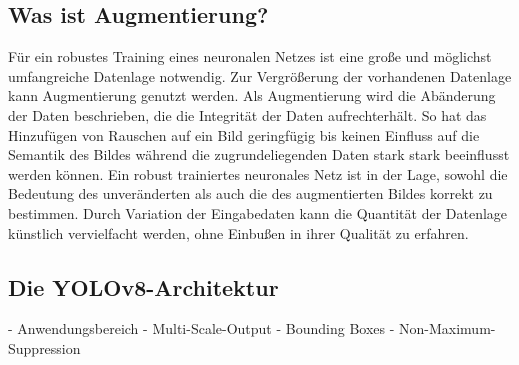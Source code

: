 

\subsection{Was ist Augmentierung?}
\label{sec:was_augmentierung}

Für ein robustes Training eines neuronalen Netzes ist eine große und möglichst umfangreiche Datenlage notwendig. Zur Vergrößerung der vorhandenen Datenlage kann Augmentierung genutzt werden. Als Augmentierung wird die Abänderung der Daten beschrieben, die die Integrität der Daten aufrechterhält. So hat das Hinzufügen von Rauschen auf ein Bild geringfügig bis keinen Einfluss auf die Semantik des Bildes während die zugrundeliegenden Daten stark stark beeinflusst werden können. Ein robust trainiertes neuronales Netz ist in der Lage, sowohl die Bedeutung des unveränderten als auch die des augmentierten Bildes korrekt zu bestimmen. Durch Variation der Eingabedaten kann die Quantität der Datenlage künstlich vervielfacht werden, ohne Einbußen in ihrer Qualität zu erfahren.



\subsection{Die YOLOv8-Architektur}
\label{sec:yolov8}

- Anwendungsbereich
- Multi-Scale-Output
- Bounding Boxes
- Non-Maximum-Suppression


